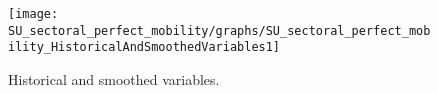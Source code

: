 
\begin{figure}[H]
\centering 
\texttt{[image: SU\_sectoral\_perfect\_mobility/graphs/SU\_sectoral\_perfect\_mobility\_HistoricalAndSmoothedVariables1]}
\caption{Historical and smoothed variables.}\label{Fig:HistoricalAndSmoothedVariables:1}
\end{figure}


